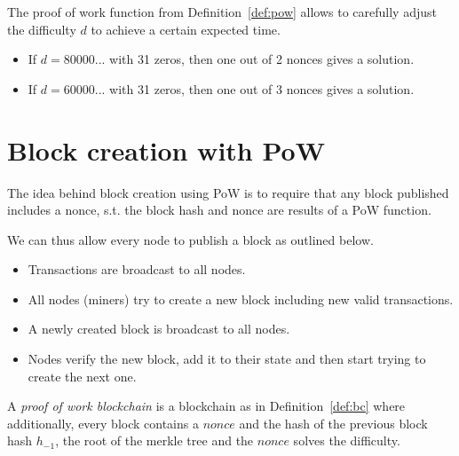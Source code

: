 
\begin{note}
	The proof of work function from Definition~\ref{def:pow} allows to carefully adjust the difficulty $d$ to achieve a certain expected time.
	\begin{itemize}
		\item If $d=80 000 ...$ with 31 zeros, then one out of 2 nonces gives a solution.
		\item If $d= 60 000 ...$ with 31 zeros, then one out of 3 nonces gives a solution.
	\end{itemize}
\end{note}


\section{Block creation with PoW}

\begin{idea}
	The idea behind block creation using PoW is to require that any block published includes a nonce, s.t. the block hash and nonce are results of a PoW function.
	
	We can thus allow every node to publish a block as outlined below.
	\begin{itemize}
		\item Transactions are broadcast to all nodes.
		\item All nodes (miners) try to create a new block including new valid transactions. 
		\item A newly created block is broadcast to all nodes.
		\item Nodes verify the new block, add it to their state and then start trying to create the next one.
	\end{itemize}
\end{idea}

\begin{definition}
A \emph{proof of work blockchain} is a blockchain as in Definition~\ref{def:bc} where additionally, every block contains a $nonce$ and the hash of the previous block hash $h_{-1}$, the root of the merkle tree and the $nonce$ solves the difficulty.	
\end{definition}

